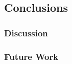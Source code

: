 \documentclass[12pt,a4paper,openright,twoside]{book}
\begin{document}

\chapter{Conclusions}\label{ch:conclusions}

\section{Discussion}\label{sec:discussion}

\section{Future Work}\label{sec:future-work}


\backmatter

\part*{}

\nocite{*} %


\end{document}
